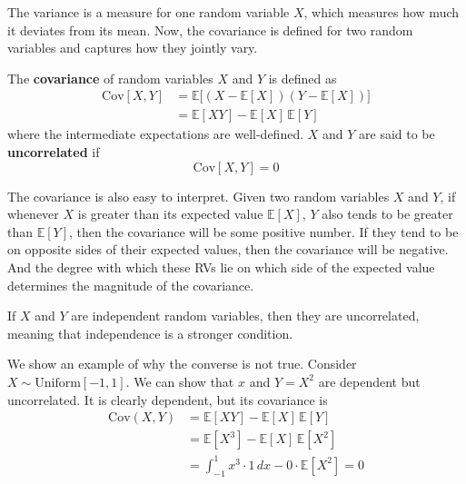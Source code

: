 \documentclass{article}
\begin{document}
    The variance is a measure for one random variable $X$, which measures how much it deviates from its mean. Now, the covariance is defined for two random variables and captures how they jointly vary. 

    \begin{definition}[Covariance]
      The \textbf{covariance} of random variables $X$ and $Y$ is defined as 
      \begin{align*}
        \mathrm{Cov}[X, Y] & = \mathbb{E} \big[ (X - \mathbb{E}[X]) (Y - \mathbb{E}[X]) \big] \\
        & = \mathbb{E}[X Y] - \mathbb{E}[X] \, \mathbb{E}[Y]
      \end{align*}
      where the intermediate expectations are well-defined. $X$ and $Y$ are said to be \textbf{uncorrelated} if 
      \begin{equation}
        \mathrm{Cov}[X, Y] = 0
      \end{equation}
    \end{definition}

    The covariance is also easy to interpret. Given two random variables $X$ and $Y$, if whenever $X$ is greater than its expected value $\mathbb{E}[X]$, $Y$ also tends to be greater than $\mathbb{E}[Y]$, then the covariance will be some positive number. If they tend to be on opposite sides of their expected values, then the covariance will be negative. And the degree with which these RVs lie on which side of the expected value determines the magnitude of the covariance. 

    \begin{theorem}
      If $X$ and $Y$ are independent random variables, then they are uncorrelated, meaning that independence is a stronger condition. 
    \end{theorem}

    We show an example of why the converse is not true. Consider $X \sim \mathrm{Uniform}[-1, 1]$. We can show that $x$ and $Y = X^2$ are dependent but uncorrelated. It is clearly dependent, but its covariance is 
    \begin{align*}
      \mathrm{Cov}(X, Y) & = \mathbb{E}[X Y] - \mathbb{E}[X] \, \mathbb{E}[Y] \\
      & = \mathbb{E}[X^3] - \mathbb{E}[X] \, \mathbb{E}[X^2] \\
      & = \int_{-1}^1 x^3 \cdot 1 \,dx - 0 \cdot \mathbb{E}[X^2] = 0
    \end{align*}
\end{document}
